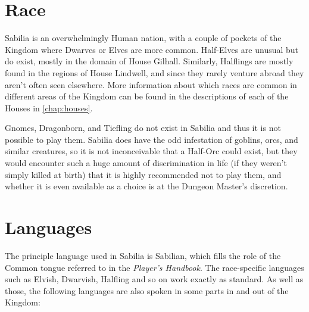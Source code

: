 \documentclass[10pt,twoside,openright,a4paper,twocolumn]{book}
\begin{document}
\section{Race}

Sabilia is an overwhelmingly Human nation, with a couple of pockets of the
Kingdom where Dwarves or Elves are more common.  Half-Elves are unusual but do
exist, mostly in the domain of House Gilhall.  Similarly, Halflings are mostly found in
the regions of House Lindwell, and since they rarely venture abroad they aren't often
seen elsewhere.  More information about which races are common in different areas
of the Kingdom can be found in the descriptions of each of the Houses in
\autoref{chap:houses}.

Gnomes, Dragonborn, and Tiefling do not exist in Sabilia and thus it is not
possible to play them.  Sabilia does have the odd infestation of goblins, orcs,
and similar creatures, so it is not inconceivable that a Half-Orc could exist,
but they would encounter such a huge amount of discrimination in life (if they
weren't simply killed at birth) that it is highly recommended not to play them,
and whether it is even available as a choice is at the Dungeon Master's
discretion.

\section{Languages}

The principle language used in Sabilia is Sabilian, which fills the role of the
Common tongue referred to in the \textit{Player's Handbook}.  The race-specific
languages such as Elvish, Dwarvish, Halfling and so on work exactly as standard.
As well as those, the following languages are also spoken in some parts in and
out of the Kingdom:
\end{document}
